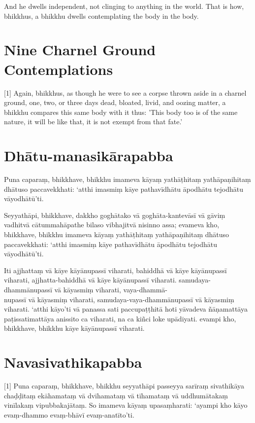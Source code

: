 And he dwells independent, not clinging to anything in the world. That is how,
bhikkhus, a bhikkhu dwells contemplating the body in the body.


\section{Nine Charnel Ground Contemplations}

[1] Again, bhikkhus, as though he were to see a corpse thrown aside in a charnel
ground, one, two, or three days dead, bloated, livid, and oozing matter, a
bhikkhu compares this same body with it thus: 'This body too is of the same
nature, it will be like that, it is not exempt from that fate.'

\paliPage
\section*{Dhātu-manasikārapabba}

Puna caparaṃ, bhikkhave, bhikkhu imameva kāyaṃ yathāṭhitaṃ yathāpaṇihitaṃ
dhātuso paccavekkhati: ‘atthi imasmiṃ kāye pathavīdhātu āpodhātu tejodhātu
vāyodhātū’ti.

Seyyathāpi, bhikkhave, dakkho goghātako vā goghāta-kantevāsī vā gāviṃ vadhitvā
cātummahāpathe bilaso vibhajitvā nisinno assa; evameva kho, bhikkhave, bhikkhu
imameva kāyaṃ yathāṭhitaṃ yathāpaṇihitaṃ dhātuso paccavekkhati: ‘atthi imasmiṃ
kāye pathavīdhātu āpodhātu tejodhātu vāyodhātū’ti.

Iti ajjhattaṃ vā kāye kāyānupassī viharati, bahiddhā vā kāye kāyānupassī
viharati, ajjhatta-bahiddhā vā kāye kāyānupassī viharati. samudaya-dhammānupassī
vā kāyasmiṃ viharati, vaya-dhammā-\\
nupassī vā kāyasmiṃ viharati, samudaya-vaya-dhammānupassī vā kāyasmiṃ viharati.
‘atthi kāyo’ti vā panassa sati paccupaṭṭhitā hoti yāvadeva ñāṇamattāya
paṭissatimattāya anissito ca viharati, na ca kiñci loke upādiyati. evampi kho,
bhikkhave, bhikkhu kāye kāyānupassī viharati.


\section*{Navasivathikapabba}

[1] Puna caparaṃ, bhikkhave, bhikkhu seyyathāpi passeyya sarīraṃ sivathikāya
chaḍḍitaṃ ekāhamataṃ vā dvīhamataṃ vā tīhamataṃ vā uddhumātakaṃ vinīlakaṃ
vipubbakajātaṃ. So imameva kāyaṃ upasaṃharati: ‘ayampi kho kāyo evaṃ-dhammo
evaṃ-bhāvī evaṃ-anatīto’ti.

